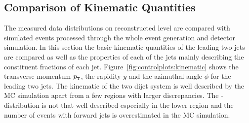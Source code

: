 \subsection{Comparison of Kinematic Quantities}

The measured data distributions on reconstructed level are compared with simulated events
processed through the whole event generation and detector simulation. In this section
the basic kinematic quantities of the leading two jets are compared as well as the properties
of each of the jets mainly describing the constituent fractions of each jet. Figure~\ref{fig:controlplots:kinematic}
shows the transverse momentum $\pt$, the rapidity $y$ and the azimuthal angle $\phi$ for the leading
two jets. The kinematic of the two dijet system is well described by the MC simulation apart from
a few regions with larger discrepancies. The \pt-distribution is not that well described especially in
the lower \pt region and the number of events with forward jets is overestimated in the MC simulation.

